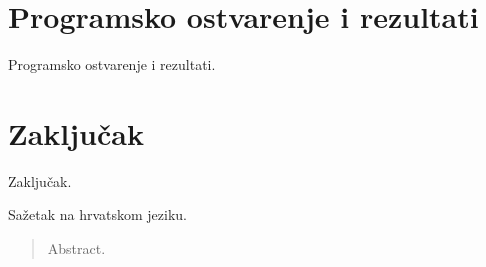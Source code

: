 \documentclass[times, utf8, zavrsni]{fer}
\begin{document}
\chapter{Programsko ostvarenje i rezultati}
\label{chap:results}
Programsko ostvarenje i rezultati.

\chapter{Zaključak}
\label{chap:conclusion}
Zaključak.




\begin{sazetak}
Sažetak na hrvatskom jeziku.

\end{sazetak}
\begin{abstract}
Abstract.

\end{abstract}
\end{document}
